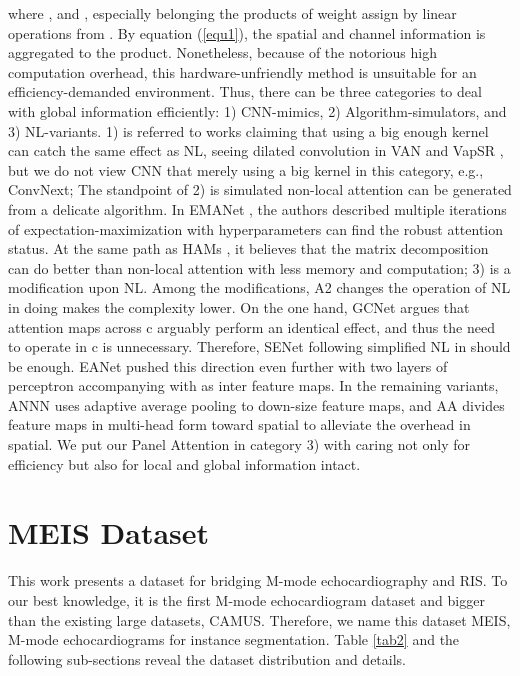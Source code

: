 \documentclass{article}
\begin{document}
where , and  , especially  belonging the products of weight assign by linear operations from . By equation (\ref{equ1}), the spatial and channel information is aggregated to the product. Nonetheless, because of the notorious high computation overhead, this hardware-unfriendly method is unsuitable for an efficiency-demanded environment. Thus, there can be three categories to deal with global information efficiently: 1) CNN-mimics, 2) Algorithm-simulators, and 3) NL-variants. 1) is referred to works claiming that using a big enough kernel can catch the same effect as NL, seeing dilated convolution in VAN \cite{guo2022visual} and VapSR \cite{zhou2022efficient}, but we do not view CNN that merely using a big kernel in this category, e.g., ConvNext; The standpoint of 2) is simulated non-local attention can be generated from a delicate algorithm. In EMANet \cite{li2019expectation}, the authors described multiple iterations of expectation-maximization with hyperparameters can find the robust attention status. At the same path as HAMs \cite{geng2021attention}, it believes that the matrix decomposition can do better than non-local attention with less memory and computation; 3) is a modification upon NL. Among the modifications, A2 \cite{chen20182} changes the operation of NL in doing  makes the complexity lower. On the one hand, GCNet \cite{cao2019gcnet} argues that attention maps across c arguably perform an identical effect, and thus the need to operate in c is unnecessary. Therefore, SENet \cite{hu2018squeeze} following simplified NL in  should be enough. EANet \cite{guo2022beyond} pushed this direction even further with two layers of perceptron accompanying with  as inter feature maps. In the remaining variants, ANNN \cite{zhu2019asymmetric} uses adaptive average pooling to down-size feature maps, and AA \cite{bello2019attention} divides feature maps in multi-head form toward spatial to alleviate the overhead in spatial. We put our Panel Attention in category 3) with caring not only for efficiency but also for local and global information intact.

\section{MEIS Dataset}
\label{sec3}

This work presents a dataset for bridging M-mode echocardiography and RIS. To our best knowledge, it is the first M-mode echocardiogram dataset and bigger than the existing large datasets, CAMUS. Therefore, we name this dataset MEIS, M-mode echocardiograms for instance segmentation. Table \ref{tab2} and the following sub-sections reveal the dataset distribution and details. 
\end{document}

